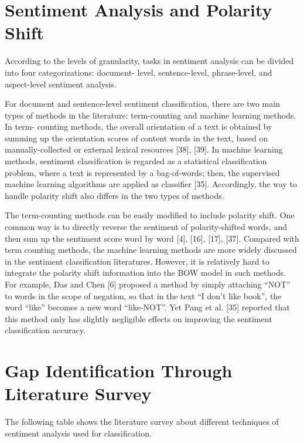 \documentclass[oneside,a4paper,12pt]{pictreport}
\begin{document}
\section{Sentiment Analysis and Polarity Shift}
\hspace{1.1cm}According to the levels of granularity, tasks in sentiment
analysis can be divided into four categorizations: document-
level, sentence-level, phrase-level, and aspect-level sentiment analysis.
\par 
For document and sentence-level sentiment classification, 
there are two main types of methods in the literature:
term-counting and machine learning methods. In term-
counting methods, the overall orientation of a text is
obtained by summing up the orientation scores of content
words in the text, based on manually-collected or external
lexical resources [38], [39]. In machine learning methods,
sentiment classification is regarded as a statistical 
classification problem, where a text is represented by a 
bag-of-words; then, the supervised machine learning algorithms
are applied as classifier [35]. Accordingly, 
the way to handle polarity shift also differs in the two types of methods.
\par
The term-counting methods can be easily modified to
include polarity shift. One common way is to directly
reverse the sentiment of polarity-shifted words, and then
sum up the sentiment score word by word [4], [16], [17],
[37]. Compared with term counting methods, the machine
learning methods are more widely discussed in the 
sentiment classification literatures. However, it is relatively
hard to integrate the polarity shift information into the
BOW model in such methods. For example, Das and
Chen [6] proposed a method by simply attaching “NOT”
to words in the scope of negation, so that in the text “I
don’t like book”, the word “like” becomes a new word “like-NOT”. Yet Pang et al. [35] reported that this method only
has slightly negligible effects on improving the sentiment
classification accuracy.
\par




\section{Gap Identification Through Literature Survey}

The following table shows the literature survey about different techniques of sentiment analysis used for classification. 
\end{document}
